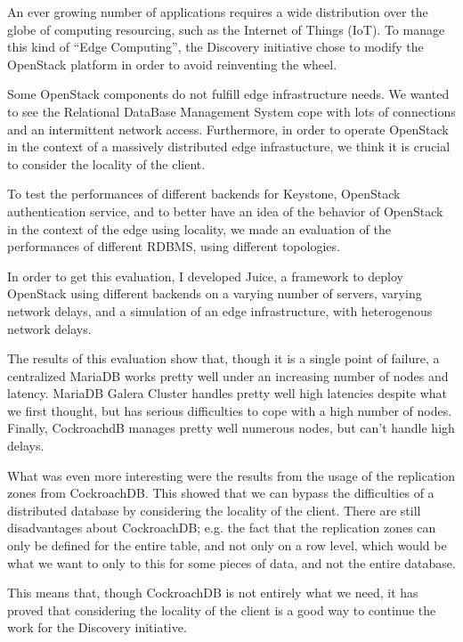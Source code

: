 An ever growing number of applications requires a wide distribution over the globe of computing resourcing, such as the Internet of Things (IoT). To manage this kind of ``Edge Computing'', the Discovery initiative chose to modify the OpenStack platform in order to avoid reinventing the wheel.

Some OpenStack components do not fulfill edge infrastructure needs. We wanted to see the Relational DataBase Management System cope with lots of connections and an intermittent network access. Furthermore, in order to operate OpenStack in the context of a massively distributed edge infrastucture, we think it is crucial to consider the locality of the client.

To test the performances of different backends for Keystone, OpenStack authentication service, and to better have an idea of the behavior of OpenStack in the context of the edge using locality, we made an evaluation of the performances of different RDBMS, using different topologies.

In order to get this evaluation, I developed Juice, a framework to deploy OpenStack using different backends on a varying number of servers, varying network delays, and a simulation of an edge infrastructure, with heterogenous network delays.

The results of this evaluation show that, though it is a single point of failure, a centralized MariaDB works pretty well under an increasing number of nodes and latency. MariaDB Galera Cluster handles pretty well high latencies despite what we first thought, but has serious difficulties to cope with a high number of nodes. Finally, CockroachdB manages pretty well numerous nodes, but can't handle high delays.

What was even more interesting were the results from the usage of the replication zones from CockroachDB. This showed that we can bypass the difficulties of a distributed database by considering the locality of the client. There are still disadvantages about CockroachDB; e.g. the fact that the replication zones can only be defined for the entire table, and not only on a row level, which would be what we want to only to this for some pieces of data, and not the entire database.

This means that, though CockroachDB is not entirely what we need, it has proved that considering the locality of the client is a good way to continue the work for the Discovery initiative.

